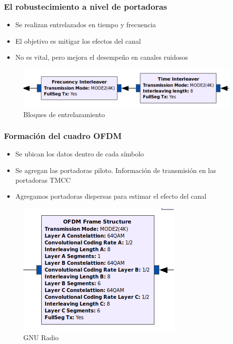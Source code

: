 \begin{frame}
\frametitle{El robustecimiento a nivel de portadoras}
\begin{itemize}	
	\item { Se realizan entrelazados en tiempo y frecuencia}
	\item {	El objetivo es mitigar los efectos del canal}
	\item { No es vital, pero mejora el desempeño en canales ruidosos }
\end{itemize}
\begin{figure}
	\includegraphics[scale=0.55]{rob_port}
	\caption{Bloques de entrelazamiento}
\end{figure}
\end{frame}
\begin{frame}
\frametitle{Formación del cuadro OFDM}
\begin{itemize}	
	\item { Se ubican los datos dentro de cada símbolo}
	\item {	Se agregan las portadoras piloto. Información de transmisión en las portadoras TMCC}
	\item { Agregamos portadoras dispersas para estimar el efecto del canal }
\end{itemize}
\begin{figure}
	\includegraphics[scale=0.4]{bloque_ofdm}
	\caption{GNU Radio}
\end{figure}
\end{frame}

